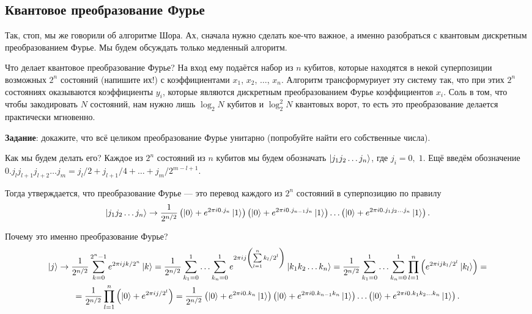 \documentclass[12pt]{article}
\begin{document}
\subsection*{Квантовое преобразование Фурье}
Так, стоп, мы же говорили об алгоритме Шора. Ах, сначала нужно сделать кое-что важное, а именно разобраться с квантовым дискретным преобразованием Фурье. Мы будем обсуждать только медленный алгоритм.

Что делает квантовое преобразование Фурье? На вход ему подаётся набор из $n$ кубитов, которые находятся в некой суперпозиции возможных $2^n$ состояний (напишите их!) с коэффициентами $x_1$, $x_2$, $\ldots$, $x_n$. Алгоритм трансформуриует эту систему так, что при этих $2^n$ состояниях оказываются коэффициенты $y_i$, которые являются дискретным преобразованием Фурье коэффициентов $x_i$. Соль в том, что чтобы закодировать $N$ состояний, нам нужно лишь $\log_2 N$ кубитов и $\log_2^2 N$ квантовых ворот, то есть это преобразование делается практически мгновенно.

{\bf Задание}: докажите, что всё целиком преобразование Фурье унитарно (попробуйте найти его собственные числа).

Как мы будем делать его? Каждое из $2^n$ состояний из $n$ кубитов мы будем обозначать $\Ket{j_1 j_2 \ldots j_n}$, где $j_i = 0,\;1$. Ещё введём обозначение $0.j_l j_{l + 1} j_{l + 2}\ldots j_m = j_l / 2 + j_{l + 1} / 4 + \ldots + j_{m} / 2^{m - l + 1}.$ 

Тогда утверждается, что преобразование Фурье --- это перевод каждого из $2^n$ состояний в суперпозицию по правилу $$\Ket{j_1 j_2 \ldots j_n} \to \frac{1}{2^{n / 2}} \left(\Ket{0} + e^{2 \pi i 0.j_n} \Ket{1} \right) \left(\Ket{0} + e^{2 \pi i 0.j_{n - 1} j_n} \Ket{1}\right)\ldots\left(\Ket{0} + e^{2 \pi i 0.j_1 j_2\ldots j_n}\Ket{1}\right).$$

Почему это именно преобразование Фурье? 
\begin{gather*}
\Ket{j} \to \frac{1}{2^{n / 2}}\sum\limits_{k = 0}^{2^n - 1} e^{2 \pi i j k / 2^n}\Ket{k} = \frac{1}{2^{n / 2}}\sum\limits_{k_1 = 0}^1 \ldots \sum\limits_{k_n = 0}^1 e^{2 \pi i j \left(\sum\limits_{l = 1}^n k_l / 2^l \right)}\Ket{k_1 k_2\ldots k_n} = \frac{1}{2^{n / 2}}\sum\limits_{k_1 = 0}^1 \ldots \sum\limits_{k_n = 0}^1 \prod\limits_{l = 1}^n \left(e^{2 \pi i j k_l / 2^l} \Ket{k_l}\right) = \\ = \frac{1}{2^{n / 2}}\prod\limits_{l = 1}^n\left(\Ket{0} + e^{2 \pi i j / 2^l} \right) = \frac{1}{2^{n / 2}} \left(\Ket{0} + e^{2 \pi i 0.k_n} \Ket{1} \right) \left(\Ket{0} + e^{2 \pi i 0.k_{n - 1} k_n} \Ket{1}\right)\ldots\left(\Ket{0} + e^{2 \pi i 0.k_1 k_2\ldots k_n}\Ket{1}\right).
\end{gather*} 
\end{document}

